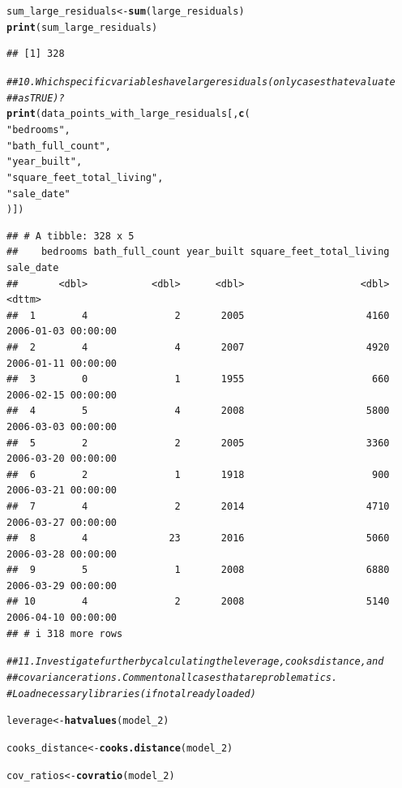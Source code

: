 \documentclass{article}\usepackage[]{graphicx}\usepackage[]{xcolor}
\makeatletter
\newcommand{\hlstr}[1]{\textcolor[rgb]{0.192,0.494,0.8}{#1}}%
\newcommand{\hlcom}[1]{\textcolor[rgb]{0.678,0.584,0.686}{\textit{#1}}}%
\newcommand{\hlstd}[1]{\textcolor[rgb]{0.345,0.345,0.345}{#1}}%
\newcommand{\hlkwb}[1]{\textcolor[rgb]{0.69,0.353,0.396}{#1}}%
\newcommand{\hlkwd}[1]{\textcolor[rgb]{0.737,0.353,0.396}{\textbf{#1}}}%
\newenvironment{kframe}{%
 \def\at@end@of@kframe{}%
 \ifinner\ifhmode%
  \def\at@end@of@kframe{\end{minipage}}%
  \begin{minipage}{\columnwidth}%
 \fi\fi%
 \def\FrameCommand##1{\hskip\@totalleftmargin \hskip-\fboxsep
 \colorbox{shadecolor}{##1}\hskip-\fboxsep
     \hskip-\linewidth \hskip-\@totalleftmargin \hskip\columnwidth}%
 \MakeFramed {\advance\hsize-\width
   \@totalleftmargin\z@ \linewidth\hsize
   \@setminipage}}%
 {\par\unskip\endMakeFramed%
 \at@end@of@kframe}
\newenvironment{knitrout}{}{} %
\makeatother
\begin{document}
\begin{knitrout}
\begin{kframe}
\begin{alltt}
\hlstd{sum_large_residuals} \hlkwb{<-} \hlkwd{sum}\hlstd{(large_residuals)}
\hlkwd{print}\hlstd{(sum_large_residuals)}
\end{alltt}
\begin{verbatim}
## [1] 328
\end{verbatim}
\begin{alltt}
\hlcom{## 10. Which specific variables have large residuals (only cases that evaluate }
\hlcom{## as TRUE)?}
\hlkwd{print}\hlstd{(data_points_with_large_residuals[,} \hlkwd{c}\hlstd{(}
  \hlstr{"bedrooms"}\hlstd{,}
  \hlstr{"bath_full_count"}\hlstd{,}
  \hlstr{"year_built"}\hlstd{,}
  \hlstr{"square_feet_total_living"}\hlstd{,}
  \hlstr{"sale_date"}
\hlstd{)])}
\end{alltt}
\begin{verbatim}
## # A tibble: 328 x 5
##    bedrooms bath_full_count year_built square_feet_total_living sale_date          
##       <dbl>           <dbl>      <dbl>                    <dbl> <dttm>             
##  1        4               2       2005                     4160 2006-01-03 00:00:00
##  2        4               4       2007                     4920 2006-01-11 00:00:00
##  3        0               1       1955                      660 2006-02-15 00:00:00
##  4        5               4       2008                     5800 2006-03-03 00:00:00
##  5        2               2       2005                     3360 2006-03-20 00:00:00
##  6        2               1       1918                      900 2006-03-21 00:00:00
##  7        4               2       2014                     4710 2006-03-27 00:00:00
##  8        4              23       2016                     5060 2006-03-28 00:00:00
##  9        5               1       2008                     6880 2006-03-29 00:00:00
## 10        4               2       2008                     5140 2006-04-10 00:00:00
## # i 318 more rows
\end{verbatim}
\begin{alltt}
\hlcom{## 11. Investigate further by calculating the leverage, cooks distance, and }
\hlcom{## covariance rations. Comment on all cases that are problematics.}
\hlcom{# Load necessary libraries (if not already loaded)}



\hlstd{leverage} \hlkwb{<-} \hlkwd{hatvalues}\hlstd{(model_2)}


\hlstd{cooks_distance} \hlkwb{<-} \hlkwd{cooks.distance}\hlstd{(model_2)}


\hlstd{cov_ratios} \hlkwb{<-} \hlkwd{covratio}\hlstd{(model_2)}



\end{alltt}
\end{kframe}
\end{knitrout}
\end{document}
